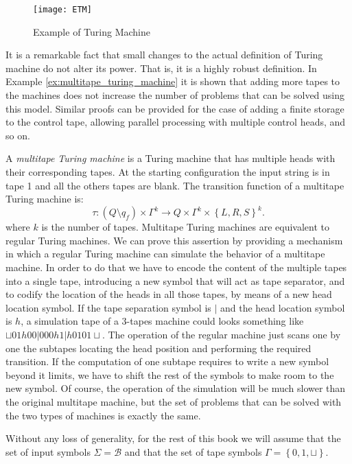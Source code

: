 \begin{figure}[h]
\centering\texttt{[image: ETM]}
\caption{\label{fig:Example-Turing-Machine}Example of Turing Machine}
\end{figure}

It is a remarkable fact that small changes to the actual definition of Turing machine do not alter its power. That is, it is a highly robust definition. In Example \ref{ex:multitape_turing_machine} it is shown that adding more tapes to the machines does not increase the number of problems that can be solved using this model. Similar proofs can be provided for the case of adding a finite storage to the control tape, allowing parallel processing with multiple control heads, and so on.

\begin{example}
\label{ex:multitape_turing_machine}
A \emph{multitape Turing machine} is a Turing machine that has multiple heads with their corresponding tapes. At the starting configuration the input string is in tape 1 and all the others tapes are blank. The transition function of a multitape Turing machine is:
\[
\tau:\left(Q \setminus q_{f} \right) \times \Gamma^k \rightarrow  Q \times \Gamma^k \times \left\{L,R,S\right\}^k.
\]
where $k$ is the number of tapes. Multitape Turing machines are equivalent to regular Turing machines. We can prove this assertion by providing a mechanism in which a regular Turing machine can simulate the behavior of a multitape machine. In order to do that we have to encode the content of the multiple tapes into a single tape, introducing a new symbol that will act as tape separator, and to codify the location of the heads in all those tapes, by means of a new head location symbol. If the tape separation symbol is $|$ and the head location symbol is $h$, a simulation tape of a 3-tapes machine could looks something like $\sqcup01h00|000h1|h0101\sqcup$. The operation of the regular machine just scans one by one the subtapes locating the head position and performing the required transition. If the computation of one subtape requires to write a new symbol beyond it limits, we have to shift the rest of the symbols to make room to the new symbol. Of course, the operation of the simulation will be much slower than the original multitape machine, but the set of problems that can be solved with the two types of machines is exactly the same.
\end{example}

Without any loss of generality, for the rest of this book we will assume that the set of input symbols $\Sigma = \mathcal{B}$ and that the set of tape symbols $\Gamma = \left\{0, 1, \sqcup \right\}$.

